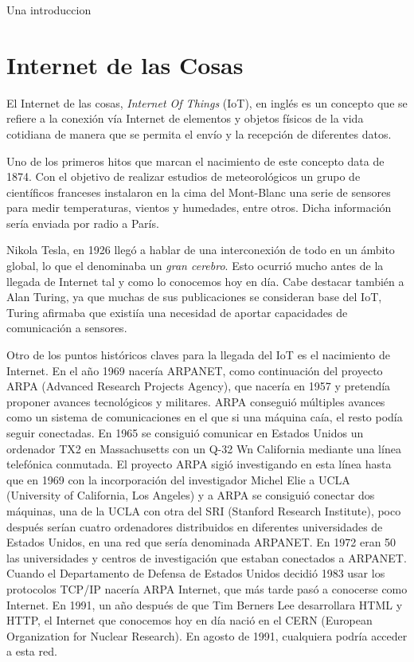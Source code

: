 \documentclass[a4paper, 12pt, oneside]{book}
\begin{document}
Una introduccion

\section{Internet de las Cosas}
\label{sec: Internet de las Cosas}
El Internet de las cosas, \textit{Internet Of Things} (IoT), en inglés es un concepto que se refiere a la conexión vía Internet de elementos y objetos físicos de la vida cotidiana de manera que se permita el envío y la recepción de diferentes datos.

Uno de los primeros hitos que marcan el nacimiento de este concepto data de 1874. Con el objetivo de realizar estudios de meteorológicos un grupo de científicos franceses instalaron en la cima del Mont-Blanc una serie de sensores para medir temperaturas, vientos y humedades, entre otros. Dicha información sería enviada por radio a París.

Nikola Tesla, en 1926 llegó a hablar de una interconexión de todo en un ámbito global, lo que el denominaba un \textit{gran cerebro}. Esto ocurrió mucho antes de la llegada de Internet tal y como lo conocemos hoy en día. Cabe destacar también a Alan Turing, ya que muchas de sus publicaciones se consideran base del IoT, Turing afirmaba que existiía una necesidad de aportar capacidades de comunicación a sensores.

Otro de los puntos históricos claves para la llegada del IoT es el nacimiento de Internet. En el año 1969 nacería ARPANET, como continuación del proyecto ARPA (Advanced Research Projects Agency), que nacería en 1957 y  pretendía proponer avances tecnológicos y militares. ARPA conseguió múltiples avances como un sistema de comunicaciones en el que si una máquina caía, el resto podía seguir conectadas. 
En 1965 se consiguió comunicar en Estados Unidos un ordenador TX2 en Massachusetts con un Q-32 Wn California mediante una línea telefónica conmutada.
El proyecto ARPA sigió investigando en esta línea hasta que en 1969 con la incorporación del investigador Michel Elie a UCLA (University of California, Los Angeles) y a ARPA se consiguió conectar dos máquinas, una de la UCLA con otra del SRI (Stanford Research Institute), poco después serían cuatro ordenadores distribuidos en diferentes universidades de Estados Unidos, en una red que sería denominada ARPANET.
En 1972 eran 50 las universidades y centros de investigación que estaban conectados a ARPANET.
Cuando el Departamento de Defensa de Estados Unidos decidió 1983 usar los protocolos TCP/IP nacería ARPA Internet, que más tarde pasó a conocerse como Internet. En 1991, un año después de que Tim Berners Lee desarrollara HTML y HTTP, el Internet que conocemos hoy en día nació en el CERN (European Organization for Nuclear Research). En agosto de 1991, cualquiera podría acceder a esta red.
\end{document}
